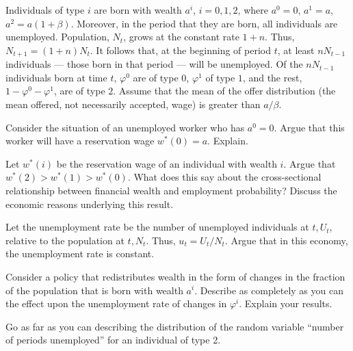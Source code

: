 \medskip
\noindent
Individuals of type $i$ are born with wealth $a^i$, $i=0,1,2$, where $a^0=0$,
$a^1=a$, $a^2=a(1+\beta)$.  Moreover, in the period that they are born, all
individuals are unemployed.  Population, $N_t$, grows at the constant rate $1+n$.
Thus, $N_{t+1} = (1+n) N_t$.  It follows that, at the beginning of period $t$,
at least $nN_{t-1}$ individuals --- those born in that period --- will be unemployed.
Of the $nN_{t-1}$ individuals born at time $t$, $\varphi^0$ are of type $0$,
$\varphi^1$ of type $1$, and the rest, $1-\varphi^0 - \varphi^1$, are of type $2$.
Assume that the mean of the offer distribution (the mean offered, not necessarily
accepted, wage) is greater than $a/\beta$.
\medskip

 Consider the situation of an unemployed worker who has $a^0=0$.
Argue that this worker will have a reservation wage $w^*(0)=a$.  Explain.
\medskip

 Let $w^*(i)$ be the reservation wage of an individual with wealth
$i$.  Argue that $w^*(2) > w^*(1) > w^*(0)$.  What does this say about the cross-sectional
relationship between financial wealth and employment probability?
Discuss the economic reasons underlying this result.
\medskip

 Let the unemployment rate be the number of unemployed
individuals at $t, U_t$, relative to the population at
$t, N_t$.  Thus, $u_t = U_t/N_t$.  Argue that in this economy,
the unemployment rate is constant.
\medskip

 Consider a policy that redistributes wealth in the form
of changes in the fraction of the population that is born with
wealth $a^i$.  Describe as completely as you can the effect upon
the unemployment rate of changes in $\varphi^i$.  Explain your results.
\medskip

 Go as far as you can describing the distribution
of the random variable ``number of periods unemployed'' for an individual
of type 2.

